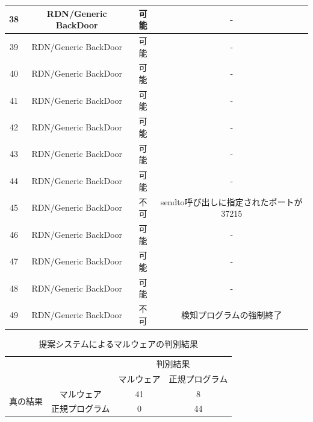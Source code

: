 \begin{small}
\begin{flushleft}
\begin{longtable}{|c|c|c|c|}
        38 & RDN/Generic BackDoor & 可能    & -                             \\ \hline
        39 & RDN/Generic BackDoor & 可能    & -                             \\ \hline
        40 & RDN/Generic BackDoor & 可能    & -                             \\ \hline
        41 & RDN/Generic BackDoor & 可能    & -                             \\ \hline
        42 & RDN/Generic BackDoor & 可能    & -                             \\ \hline
        43 & RDN/Generic BackDoor & 可能    & -                             \\ \hline
        44 & RDN/Generic BackDoor & 可能    & -                             \\ \hline
        45 & RDN/Generic BackDoor & 不可    & sendto呼び出しに指定されたポートが37215      \\ \hline
        46 & RDN/Generic BackDoor & 可能    & -                             \\ \hline
        47 & RDN/Generic BackDoor & 可能    & -                             \\ \hline
        48 & RDN/Generic BackDoor & 可能    & -                             \\ \hline
        49 & RDN/Generic BackDoor & 不可    & 検知プログラムの強制終了                  \\ \hline
    
\end{longtable}
\end{flushleft}
\end{small}

\begin{table}[h]
    \centering
    \caption{提案システムによるマルウェアの判別結果}
    \label{tab:detect}
    \begin{tabular}{cc|c|c|}
    \cline{3-4}
    & \multicolumn{1}{l|}{} & \multicolumn{2}{c|}{判別結果} \\ \cline{3-4} 
    &                       & マルウェア      & 正規プログラム      \\ \hline
    \multicolumn{1}{|c|}{\multirow{2}{*}{真の結果}} & マルウェア                 & 41         & 8            \\ \cline{2-4} 
    \multicolumn{1}{|c|}{}                      & 正規プログラム               & 0          & 44           \\ \hline
    \end{tabular}
    \end{table}

